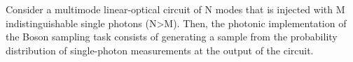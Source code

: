 \documentclass[preview]{standalone}\usepackage[english]{babel}\usepackage{amsmath}\usepackage{amssymb}\usepackage{dsfont}\usepackage{setspace}\usepackage{tipa}\usepackage{relsize}\usepackage{textcomp}\usepackage{mathrsfs}\usepackage{calligra}\usepackage{wasysym}\usepackage{ragged2e}\usepackage{physics}\usepackage{xcolor}\usepackage{microtype}\linespread{1}
\begin{document}
\centering 
        Consider a multimode linear-optical circuit of N modes 
        that is injected with M indistinguishable single photons (N>M). 
        Then, the photonic implementation of the Boson sampling task 
        consists of generating a sample from the probability 
        distribution of single-photon measurements at the output 
        of the circuit.
\end{document}
